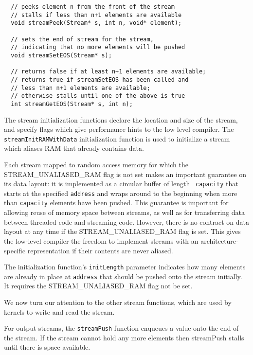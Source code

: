 {\begin{verbatim}
  // peeks element n from the front of the stream
  // stalls if less than n+1 elements are available
  void streamPeek(Stream* s, int n, void* element);

  // sets the end of stream for the stream,
  // indicating that no more elements will be pushed  
  void streamSetEOS(Stream* s);

  // returns false if at least n+1 elements are available;
  // returns true if streamSetEOS has been called and
  // less than n+1 elements are available;
  // otherwise stalls until one of the above is true
  int streamGetEOS(Stream* s, int n);
\end{verbatim}}

 The stream initialization functions declare the location and size of the stream, and specify flags which give performance hints to the low level compiler. The {\tt streamInitRAMWithData} initialization function is used to initialize a stream which aliases RAM that already contains data.

Each stream mapped to random access memory for which the STREAM\_UNALIASED\_RAM flag is not set makes an important guarantee on its data layout: 
it is implemented as a circular buffer of length {\tt
capacity} that starts at the specified {\tt address} and wraps around to the beginning when more than {\tt capacity} elements have been pushed.  This guarantee is important for allowing reuse of memory space between streams, as well as for transferring data between threaded code and streaming code.  However, there is no contract on data layout at any time if the STREAM\_UNALIASED\_RAM flag is set. This gives 
the low-level compiler the freedom to implement streams with an 
architecture-specific representation if their contents are never aliased.

The initialization function's {\tt initLength} parameter indicates how many elements are already in place at {\tt address} that should be pushed onto the stream initially. It requires the STREAM\_UNALIASED\_RAM flag not be set.


We now turn our attention to the other stream functions, which are used by kernels to write and read the stream.

 For output streams, the {\tt streamPush} function enqueues a value onto the end of the stream.  If the stream cannot hold any more elements 
then streamPush stalls until there is space available. 

